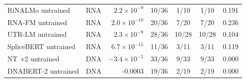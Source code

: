\begin{table}[htbp]
\begin{tabular}{llrcccc}
RiNALMo untrained            & RNA & $2.2 \times 10^{-9}$ & 10/36 & 1/10 & 1/10 & 0.191 \\
RNA-FM untrained             & RNA & $2.0 \times 10^{-10}$ & 20/36 & 7/20 & 7/20 & 0.236 \\
UTR-LM untrained             & RNA & $2.3 \times 10^{-9}$ & 28/36 & 10/28 & 10/28 & 0.104 \\
SpliceBERT untrained         & RNA & $6.7 \times 10^{-15}$ & 11/36 & 3/11 & 3/11 & 0.119 \\
NT~v2 untrained              & DNA & $-3.4 \times 10^{-5}$ & 33/36 & 9/33 & 9/33 & 0.000 \\
DNABERT-2 untrained          & DNA & -0.0003 & 19/36 & 2/19 & 2/19 & 0.000 \\
\bottomrule
\end{tabular}
\end{table}
